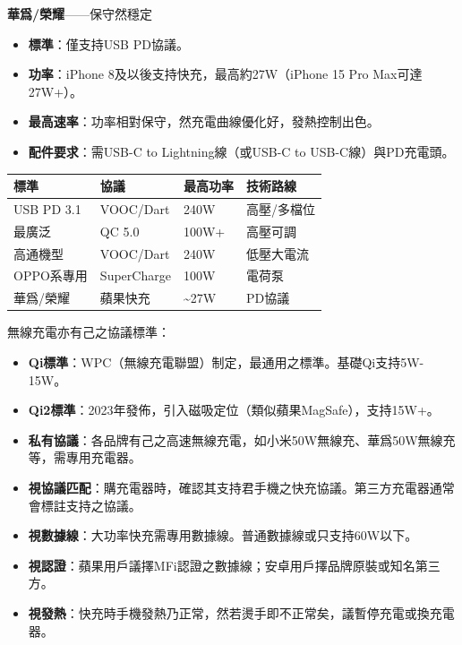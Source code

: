 \textbf{華爲/榮耀}——保守然穩定

\begin{itemize}
  \item \textbf{標準}：僅支持USB PD協議。
  \item \textbf{功率}：iPhone 8及以後支持快充，最高約27W（iPhone 15 Pro Max可達27W+）。
  \item \textbf{最高速率}：功率相對保守，然充電曲線優化好，發熱控制出色。
  \item \textbf{配件要求}：需USB-C to Lightning線（或USB-C to USB-C線）與PD充電頭。
\end{itemize}


\begin{center}
\begin{tabularx}{\linewidth}{|X|X|X|X|}
\hline
\textbf{標準} & \textbf{協議} & \textbf{最高功率} & \textbf{技術路線} \tabularnewline
\hline
USB PD 3.1 & VOOC/Dart & 240W & 高壓/多檔位 \tabularnewline
最廣泛 & QC 5.0 & 100W+ & 高壓可調 \tabularnewline
高通機型 & VOOC/Dart & 240W & 低壓大電流 \tabularnewline
OPPO系專用 & SuperCharge & 100W & 電荷泵 \tabularnewline
華爲/榮耀 & 蘋果快充 & \textasciitilde{}27W & PD協議 \tabularnewline
\hline
\end{tabularx}
\end{center}


無線充電亦有己之協議標準：

\begin{itemize}
  \item \textbf{Qi標準}：WPC（無線充電聯盟）制定，最通用之標準。基礎Qi支持5W-15W。
  \item \textbf{Qi2標準}：2023年發佈，引入磁吸定位（類似蘋果MagSafe），支持15W+。
  \item \textbf{私有協議}：各品牌有己之高速無線充電，如小米50W無線充、華爲50W無線充等，需專用充電器。
\end{itemize}


\begin{itemize}
  \item \textbf{視協議匹配}：購充電器時，確認其支持君手機之快充協議。第三方充電器通常會標註支持之協議。
  \item \textbf{視數據線}：大功率快充需專用數據線。普通數據線或只支持60W以下。
  \item \textbf{視認證}：蘋果用戶議擇MFi認證之數據線；安卓用戶擇品牌原裝或知名第三方。
  \item \textbf{視發熱}：快充時手機發熱乃正常，然若燙手即不正常矣，議暫停充電或換充電器。
\end{itemize}

